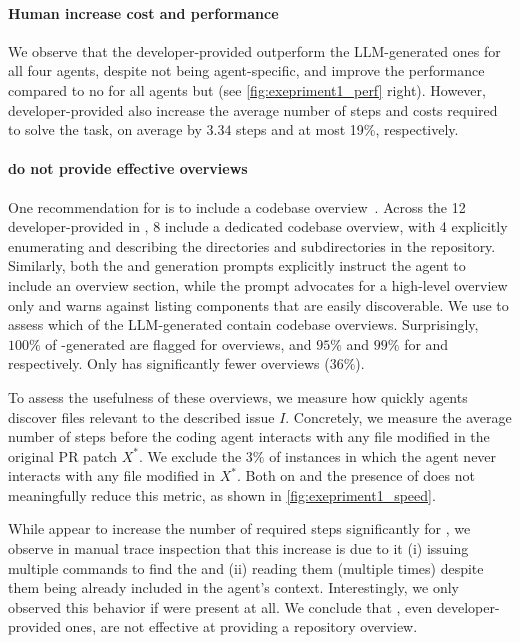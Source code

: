 \paragraph{Human \agentsmds{} increase cost and performance}
We observe that the developer-provided \agentsmds{} outperform the LLM-generated ones for all four agents, despite not being agent-specific, and improve the performance compared to no \agentsmds{} for all agents but \claudecode{} (see \cref{fig:exepriment1_perf} right).
However, developer-provided \agentsmds{} also increase the average number of steps and costs required to solve the task, on average by $3.34$ steps and at most 19\%, respectively.

\paragraph{\Agentsmds{} do not provide effective overviews}
One recommendation for \agentsmds{} is to include a codebase overview~\citep{AGENTSMd2025}.
Across the 12 developer-provided \agentsmds{} in \planbench{}, 8 include a dedicated codebase overview, with 4 explicitly enumerating and describing the directories and subdirectories in the repository.
Similarly, both the \codex{} and \qwencode{} \agentsmd{} generation prompts explicitly instruct the agent to include an overview section, while the \claudecode{} prompt advocates for a high-level overview only and warns against listing components that are easily discoverable.
We use \gptoss{} to assess which of the LLM-generated \agentsmds{} contain codebase overviews.
Surprisingly, $100\%$ of \sonnet{}-generated \agentsmds{} are flagged for overviews, and $95\%$ and $99\%$ for \qwen{} and \gptfive{} respectively. Only \gptfivemini{} has significantly fewer overviews ($36\%$).




To assess the usefulness of these overviews, we measure how quickly agents discover files relevant to the described issue $I$.
Concretely, we measure the average number of steps before the coding agent interacts with any file modified in the original PR patch $X^{*}$.
We exclude the $3\%$ of instances in which the agent never interacts with any file modified in $X^{*}$. 
Both on \swebench{} and \planbench{} the presence of \agentsmds{} does not meaningfully reduce this metric, as shown in \cref{fig:exepriment1_speed}.

While \agentsmds{} appear to increase the number of required steps significantly for \gptfivemini{}, we observe in manual trace inspection that this increase is due to it (i) issuing multiple commands to find the \agentsmds{} and (ii) reading them (multiple times) despite them being already included in the agent's context. Interestingly, we only observed this behavior if \agentsmds{} were present at all.
We conclude that \agentsmds{}, even developer-provided ones, are not effective at providing a repository overview.


